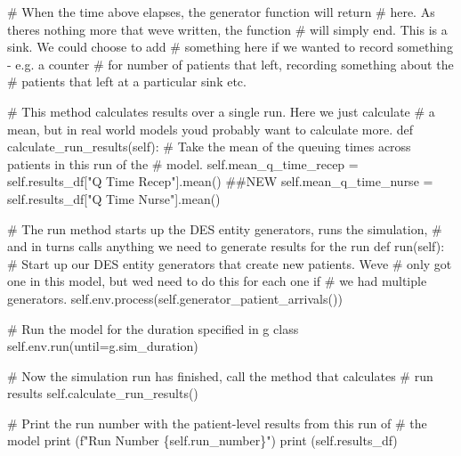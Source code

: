 \documentclass[
  letterpaper,
  DIV=11,
  numbers=noendperiod]{scrreprt}
\newenvironment{Shaded}{\begin{snugshade}}{\end{snugshade}}
\newcommand{\BuiltInTok}[1]{\textcolor[rgb]{0.00,0.23,0.31}{#1}}
\newcommand{\CommentTok}[1]{\textcolor[rgb]{0.37,0.37,0.37}{#1}}
\newcommand{\KeywordTok}[1]{\textcolor[rgb]{0.00,0.23,0.31}{#1}}
\newcommand{\NormalTok}[1]{\textcolor[rgb]{0.00,0.23,0.31}{#1}}
\newcommand{\OperatorTok}[1]{\textcolor[rgb]{0.37,0.37,0.37}{#1}}
\newcommand{\SpecialCharTok}[1]{\textcolor[rgb]{0.37,0.37,0.37}{#1}}
\newcommand{\SpecialStringTok}[1]{\textcolor[rgb]{0.13,0.47,0.30}{#1}}
\newcommand{\StringTok}[1]{\textcolor[rgb]{0.13,0.47,0.30}{#1}}
\newcommand{\VariableTok}[1]{\textcolor[rgb]{0.07,0.07,0.07}{#1}}
\begin{document}
\begin{tcolorbox}
\begin{Shaded}
\begin{Highlighting}[]
            \CommentTok{\# When the time above elapses, the generator function will return}
            \CommentTok{\# here.  As there\textquotesingle{}s nothing more that we\textquotesingle{}ve written, the function}
            \CommentTok{\# will simply end.  This is a sink.  We could choose to add}
            \CommentTok{\# something here if we wanted to record something {-} e.g. a counter}
            \CommentTok{\# for number of patients that left, recording something about the}
            \CommentTok{\# patients that left at a particular sink etc.}

    \CommentTok{\# This method calculates results over a single run.  Here we just calculate}
    \CommentTok{\# a mean, but in real world models you\textquotesingle{}d probably want to calculate more.}
    \KeywordTok{def}\NormalTok{ calculate\_run\_results(}\VariableTok{self}\NormalTok{):}
        \CommentTok{\# Take the mean of the queuing times across patients in this run of the}
        \CommentTok{\# model.}
        \VariableTok{self}\NormalTok{.mean\_q\_time\_recep }\OperatorTok{=} \VariableTok{self}\NormalTok{.results\_df[}\StringTok{"Q Time Recep"}\NormalTok{].mean() }\CommentTok{\#\#NEW}
        \VariableTok{self}\NormalTok{.mean\_q\_time\_nurse }\OperatorTok{=} \VariableTok{self}\NormalTok{.results\_df[}\StringTok{"Q Time Nurse"}\NormalTok{].mean()}

    \CommentTok{\# The run method starts up the DES entity generators, runs the simulation,}
    \CommentTok{\# and in turns calls anything we need to generate results for the run}
    \KeywordTok{def}\NormalTok{ run(}\VariableTok{self}\NormalTok{):}
        \CommentTok{\# Start up our DES entity generators that create new patients.  We\textquotesingle{}ve}
        \CommentTok{\# only got one in this model, but we\textquotesingle{}d need to do this for each one if}
        \CommentTok{\# we had multiple generators.}
        \VariableTok{self}\NormalTok{.env.process(}\VariableTok{self}\NormalTok{.generator\_patient\_arrivals())}

        \CommentTok{\# Run the model for the duration specified in g class}
        \VariableTok{self}\NormalTok{.env.run(until}\OperatorTok{=}\NormalTok{g.sim\_duration)}

        \CommentTok{\# Now the simulation run has finished, call the method that calculates}
        \CommentTok{\# run results}
        \VariableTok{self}\NormalTok{.calculate\_run\_results()}

        \CommentTok{\# Print the run number with the patient{-}level results from this run of}
        \CommentTok{\# the model}
        \BuiltInTok{print}\NormalTok{ (}\SpecialStringTok{f"Run Number }\SpecialCharTok{\{}\VariableTok{self}\SpecialCharTok{.}\NormalTok{run\_number}\SpecialCharTok{\}}\SpecialStringTok{"}\NormalTok{)}
        \BuiltInTok{print}\NormalTok{ (}\VariableTok{self}\NormalTok{.results\_df)}


\end{Highlighting}
\end{Shaded}
\end{tcolorbox}
\end{document}
